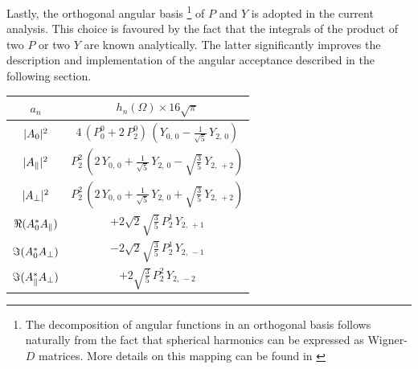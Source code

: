 Lastly, the orthogonal angular basis
\footnote{The decomposition of angular functions in an orthogonal basis follows naturally from the fact that spherical
harmonics can be expressed as Wigner-$D$ matrices. More details on this mapping can be found in \cite{jeroenThesis} }
of $P$ and $Y$ is adopted in the current analysis. This choice is favoured by the fact that the integrals
of the product of two $P$ or two $Y$ are known analytically. The latter significantly improves the description and implementation
of the angular acceptance described in the following section.

\begin{table}[t]
  \centering
  \renewcommand{\arraystretch}{1.2}
  \begin{tabular}{cc}
    \hline
      $a_n$  &
      $h_n(\Omega) \times 16\sqrt{\pi}$       \\ %

    \hline
      $|{A}_{0}|^2$   &
      $4\, (P_0^0 + 2\, P_2^0)\, (Y_{0,\,0} - \tfrac{1}{\sqrt{5}}\, Y_{2,\,0})$  \\ %

    $|{A}_{\parallel}|^2$  &
      $P_2^2\, (2\, Y_{0,\,0} + \tfrac{1}{\sqrt{5}}\, Y_{2,\,0} - \sqrt{\tfrac{3}{5}}\, Y_{2,\,+2})$ \\ %

    $|{A}_{\perp}|^2$  &
      $P_2^2\, (2\, Y_{0,\,0} + \tfrac{1}{\sqrt{5}}\, Y_{2,\,0} + \sqrt{\tfrac{3}{5}}\, Y_{2,\,+2})$  \\ %

    $\Re({A}_{0}^* {A}_{\parallel})$  &
      $+2\sqrt{2}\sqrt{\tfrac{3}{5}}\, P_2^1\, Y_{2,\,+1}$  \\ %

    $\Im({A}_{0}^* {A}_{\perp})$  &
      $-2\sqrt{2}\sqrt{\tfrac{3}{5}}\, P_2^1\, Y_{2,\,-1}$  \\ %


    $\Im({A}_{\parallel}^* {A}_{\perp})$  &
      $+2\sqrt{\tfrac{3}{5}}\, P_2^2\, Y_{2,\,-2}$  \\ %


\end{tabular}
\end{table}
